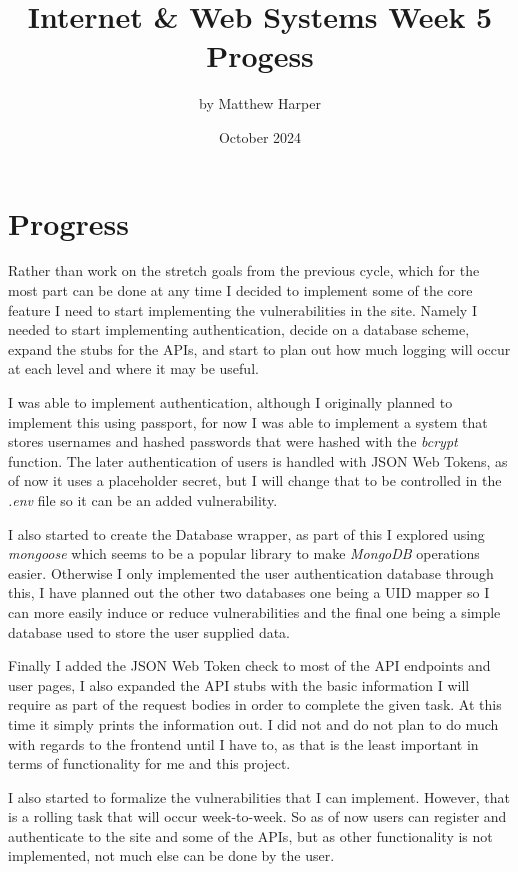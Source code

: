 \documentclass{article}
\title{Internet \& Web Systems Week 5 Progess}
\author{by Matthew Harper }
\date{October 2024}
\begin{document}
\maketitle
\section{Progress}
Rather than work on the stretch goals from the previous cycle, which for the most part can be done at any time I decided to implement some of the
core feature I need to start implementing the vulnerabilities in the site. Namely I needed to start implementing authentication, decide on a database
scheme, expand the stubs for the APIs, and start to plan out how much logging will occur at each level and where it may be useful.

I was able to implement authentication, although I originally planned to implement this using passport, for now I was able to implement a system that stores
usernames and hashed passwords that were hashed with the \textit{bcrypt} function. The later authentication of users is handled with JSON Web Tokens, as of
now it uses a placeholder secret, but I will change that to be controlled in the \textit{.env} file so it can be an added vulnerability.

I also started to create the Database wrapper, as part of this I explored using \textit{mongoose} which seems to be a popular library to make \textit{MongoDB}
operations easier. Otherwise I only implemented the user authentication database through this, I have planned out the other two databases one being a UID
mapper so I can more easily induce or reduce vulnerabilities and the final one being a simple database used to store the user supplied data.

Finally I added the JSON Web Token check to most of the API endpoints and user pages, I also expanded the API stubs with the basic information I will require
as part of the request bodies in order to complete the given task. At this time it simply prints the information out. I did not and do not plan to do much
with regards to the frontend until I have to, as that is the least important in terms of functionality for me and this project.

I also started to formalize the vulnerabilities that I can implement. However, that is a rolling task that will occur week-to-week. So as of now users can
register and authenticate to the site and some of the APIs, but as other functionality is not implemented, not much else can be done by the user.
\end{document}
